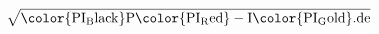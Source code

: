 \documentclass[tikz,convert={outfile=\jobname.svg}]{standalone}
\begin{document}
   \color{PI_Dark_Gray}
   \[
    \sqrt{ \mathrm{\color{PI_Black}P}\mathrm{\color{PI_Red}-I}\mathrm{\color{PI_Gold}.de}}
   \]
\end{document}
